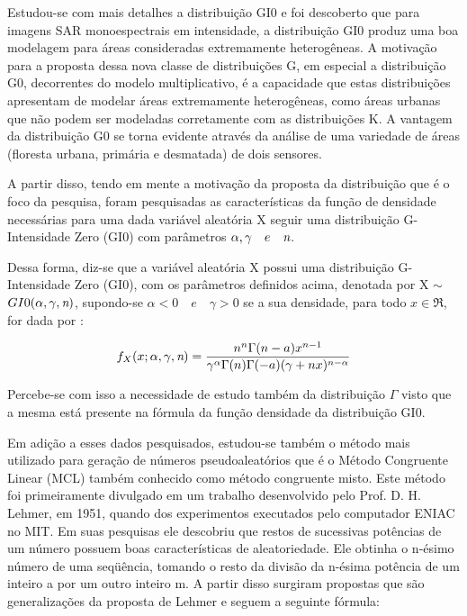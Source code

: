 Estudou-se com mais detalhes a distribuição GI0 e foi descoberto que para imagens SAR monoespectrais em intensidade, a distribuição GI0 produz uma boa modelagem para áreas consideradas extremamente heterogêneas. A motivação para a proposta dessa nova classe de distribuições G, em especial a distribuição G0, decorrentes do modelo multiplicativo, é a capacidade que estas distribuições apresentam de modelar áreas extremamente heterogêneas, como áreas urbanas que não podem ser modeladas corretamente com as distribuições K. A vantagem da distribuição G0 se torna evidente através da análise de uma variedade de áreas (floresta urbana, primária e desmatada) de dois sensores.

A partir disso, tendo em mente a motivação da proposta da distribuição que é o foco da pesquisa, foram pesquisadas as características da função de densidade necessárias para uma dada variável aleatória X seguir uma distribuição G-Intensidade Zero (GI0) com parâmetros \begin{math} \alpha , \gamma \quad e \quad \emph{n} \end{math}.

Dessa forma, diz-se que a variável aleatória X possui uma distribuição G-Intensidade Zero (GI0), com os 
parâmetros definidos acima, denotada por  X $\sim$  \begin{math} GI0(\alpha, \gamma ,\emph{n}) \end{math}, supondo-se \begin{math} \alpha < 0 \quad e \quad \gamma > 0 \end{math} se a sua densidade, para todo \begin{math} x \in \Re \end{math}, for dada por :

\begin{equation}
	f_{X}(x;\alpha, \gamma, \emph{n}) = \frac{n^{n}\Gamma(n-a)x^{n-1}}{\gamma^{\alpha}\Gamma(n)\Gamma(-a)(\gamma + nx)^{n-\alpha}} 
\end{equation}

Percebe-se com isso a necessidade de estudo também da distribuição \begin{math} \Gamma \end{math} visto que a mesma está presente na fórmula da função densidade da distribuição GI0.

Em adição a esses dados pesquisados, estudou-se também o método mais utilizado para geração de números pseudoaleatórios que é o Método Congruente Linear (MCL) também conhecido como método congruente misto. Este método foi primeiramente divulgado em um trabalho desenvolvido pelo Prof. D. H. Lehmer, em 1951, quando dos
experimentos executados pelo computador ENIAC no MIT.
Em suas pesquisas ele descobriu que restos de sucessivas potências de um número possuem
boas características de aleatoriedade. Ele obtinha o n-ésimo número de uma seqüência,
tomando o resto da divisão da n-ésima potência de um inteiro a por um outro inteiro m. 
A partir disso surgiram propostas que são generalizações da proposta de Lehmer e seguem a seguinte fórmula:

